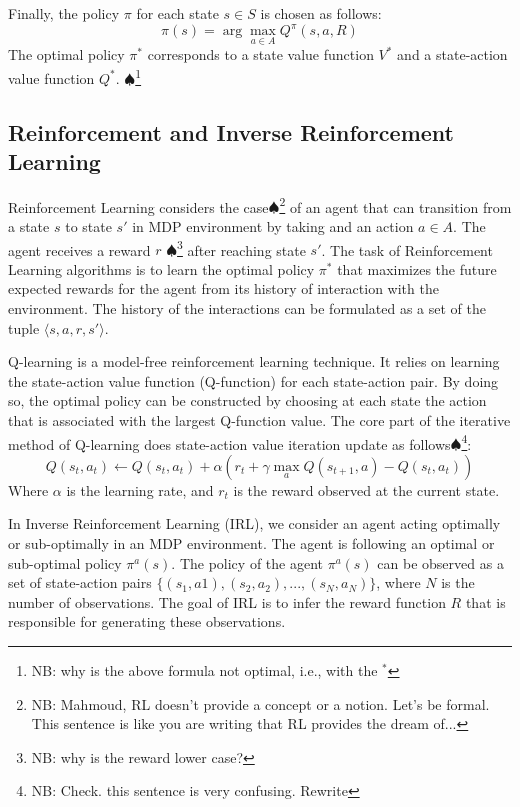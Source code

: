 \documentclass[letterpaper, 10 pt, conference]{ieeeconf}  %
\newcommand\NB[1]{$\spadesuit$\footnote{NB: #1}}
\begin{document}
Finally, the policy $\pi$ for each state $s \in S$ is chosen as follows:
\begin{equation}
\pi(s) = \arg\!\max_{a\in A} Q^\pi(s,a,R)
\end{equation}
The optimal policy $\pi^*$ corresponds to a state value function $V^*$ and a state-action value function $Q^*$. \NB{why is the above formula not optimal, i.e., with the $^*$}

\subsection{Reinforcement and Inverse Reinforcement Learning}
Reinforcement Learning considers the case\NB{Mahmoud, RL doesn't provide a concept or a notion. Let's be formal. This sentence is like you are writing that RL provides the dream of...} of an agent that can transition from a state $s$ to state $s'$ in MDP environment by taking and an action $a \in A$. The agent receives a reward $r$ \NB{why is the reward lower case?} after reaching state $s'$. The task of Reinforcement Learning algorithms is to learn the optimal policy $\pi^*$ that maximizes the future expected rewards for the agent from its history of interaction with the environment. The history of the interactions can be formulated as a set of the tuple $\big \langle s,a,r,s' \big \rangle$.

Q-learning is a model-free reinforcement learning technique. It relies on learning the state-action value function (Q-function) for each state-action pair. By doing so, the optimal policy can be constructed by choosing at each state the action that is associated with the largest Q-function value. The core part of the iterative method of Q-learning does state-action value iteration update as follows\NB{Check. this sentence is very confusing. Rewrite}:
\begin{equation}\label{eq:qlearn}
    Q(s_t,a_t) \leftarrow Q(s_t,a_t) + \alpha ( r_t + \gamma \max_{a} Q(s_{t+1},a) - Q(s_t,a_t))
\end{equation}
Where $\alpha$ is the learning rate, and $r_t$ is the reward observed at the current state.

In Inverse Reinforcement Learning (IRL), we consider an agent acting optimally or sub-optimally in an MDP environment. The agent is following an optimal or sub-optimal policy $\pi^a(s)$. The policy of the agent $\pi^a(s)$ can be observed as a set of state-action pairs $\{(s_1,a1),(s_2,a_2), ...,(s_N,a_N)\}$, where $N$ is the number of observations. The goal of IRL is to infer the reward function $R$ that is responsible for generating these observations.%
\end{document}
